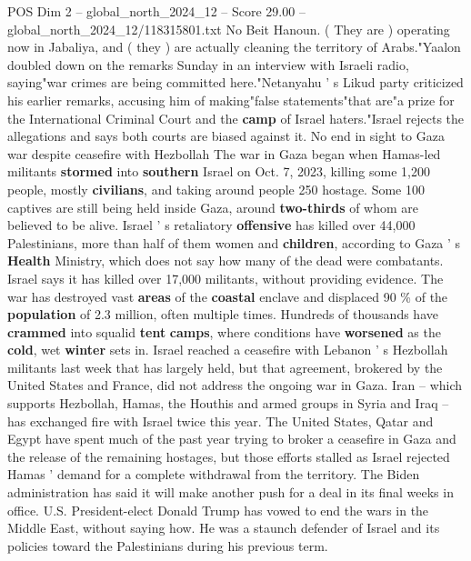 \begin{textsample}{POS Dim 2 – global\_north\_2024\_12 – Score 29.00 – global\_north\_2024\_12/118315801.txt}
No Beit Hanoun. ( They are ) operating now in Jabaliya, and ( they ) are actually cleaning the territory of Arabs."Yaalon doubled down on the remarks Sunday in an interview with Israeli radio, saying"war crimes are being committed here."Netanyahu ' s Likud party criticized his earlier remarks, accusing him of making"false statements"that are"a prize for the International Criminal Court and the \textbf{camp} of Israel haters."Israel rejects the allegations and says both courts are biased against it.
No end in sight to Gaza war despite ceasefire with Hezbollah The war in Gaza began when Hamas-led militants \textbf{stormed} into \textbf{southern} Israel on Oct. 7, 2023, killing some 1,200 people, mostly \textbf{civilians}, and taking around people 250 hostage.
Some 100 captives are still being held inside Gaza, around \textbf{two-thirds} of whom are believed to be alive.
Israel ' s retaliatory \textbf{offensive} has killed over 44,000 Palestinians, more than half of them women and \textbf{children}, according to Gaza ' s \textbf{Health} Ministry, which does not say how many of the dead were combatants.
Israel says it has killed over 17,000 militants, without providing evidence.
The war has destroyed vast \textbf{areas} of the \textbf{coastal} enclave and displaced 90 \% of the \textbf{population} of 2.3 million, often multiple times.
Hundreds of thousands have \textbf{crammed} into squalid \textbf{tent} \textbf{camps}, where conditions have \textbf{worsened} as the \textbf{cold}, wet \textbf{winter} sets in.
Israel reached a ceasefire with Lebanon ' s Hezbollah militants last week that has largely held, but that agreement, brokered by the United States and France, did not address the ongoing war in Gaza.
Iran -- which supports Hezbollah, Hamas, the Houthis and armed groups in Syria and Iraq -- has exchanged fire with Israel twice this year.
The United States, Qatar and Egypt have spent much of the past year trying to broker a ceasefire in Gaza and the release of the remaining hostages, but those efforts stalled as Israel rejected Hamas ' demand for a complete withdrawal from the territory.
The Biden administration has said it will make another push for a deal in its final weeks in office.
U.S.
President-elect Donald Trump has vowed to end the wars in the Middle East, without saying how.
He was a staunch defender of Israel and its policies toward the Palestinians during his previous term.

\end{textsample}
